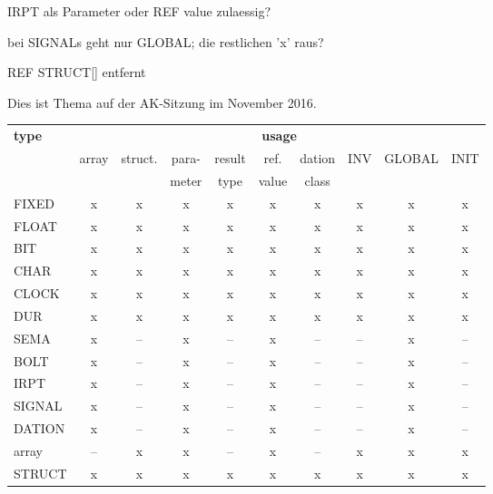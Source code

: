 \begin{discuss}
IRPT als Parameter oder REF value zulaessig?

bei SIGNALs geht nur GLOBAL; die restlichen 'x' raus?

REF STRUCT[] entfernt

Dies ist Thema auf der AK-Sitzung im November 2016.


\end{discuss}
\begin{table}[htb]
\begin{tabular}{lccccccccc}
{\bf type}     & \multicolumn{9}{c}{{\bf usage}} \\ 
               & array & struct. & para- & result & ref.  & dation & INV & GLOBAL & INIT \\ 
               &       &         & meter & type   & value & class  &     &        &      \\ \hline
FIXED          & x     &  x      & x     &  x     &  x    &   x    &  x  &    x   &  x   \\
FLOAT          & x     &  x      & x     &  x     &  x    &   x    &  x  &    x   &  x   \\
BIT            & x     &  x      & x     &  x     &  x    &   x    &  x  &    x   &  x   \\
CHAR           & x     &  x      & x     &  x     &  x    &   x    &  x  &    x   &  x   \\
CLOCK          & x     &  x      & x     &  x     &  x    &   x    &  x  &    x   &  x   \\
DUR            & x     &  x      & x     &  x     &  x    &   x    &  x  &    x   &  x   \\
SEMA           & x     &  --     & x     &  --    &  x    &   --   &  -- &    x   &  --  \\
BOLT           & x     &  --     & x     &  --    &  x    &   --   &  -- &    x   &  --  \\
IRPT           & x     &  --     & x     &  --    &  x    &   --   &  -- &    x   &  --  \\
SIGNAL         & x     &  --     & x     &  --    &  x    &   --   &  -- &    x   &  --  \\
DATION         & x     &  --     & x     &  --    &  x    &   --   &  -- &    x   &  --  \\
array          & --    &  x      & x     &  --    &  x    &   --   &  x  &    x   &  x   \\
STRUCT         & x     &  x      & x     &  x     &  x    &   x    &  x  &    x   &  x   \\

\end{tabular}
\end{table}

